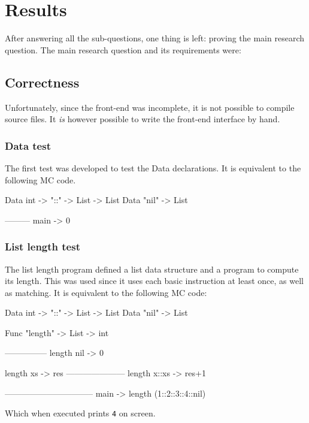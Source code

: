\section{Results}\label{results}
After answering all the sub-questions, one thing is left: proving the main research question.
The main research question and its requirements were:



\subsection{Correctness}
Unfortunately, since the front-end was incomplete, it is not possible to compile source files.
It \textit{is} however possible to write the front-end interface by hand.

\subsubsection{Data test}
The first test was developed to test the Data declarations.
It is equivalent to the following MC code.

\begin{MC}
Data int -> "::" -> List -> List
Data "nil" -> List

---------
main -> 0
\end{MC}

\subsubsection{List length test}
The list length program defined a list data structure and a program to compute its length.
This was used since it uses each basic instruction at least once, as well as matching.
It is equivalent to the following MC code:

\begin{MC}
Data int -> "::" -> List -> List
Data "nil" -> List

Func "length" -> List -> int

---------------
length nil -> 0

length xs -> res
---------------------
length x::xs -> res+1

--------------------------------
main -> length (1::2::3::4::nil)
\end{MC}

Which when executed prints \verb|4| on screen.


